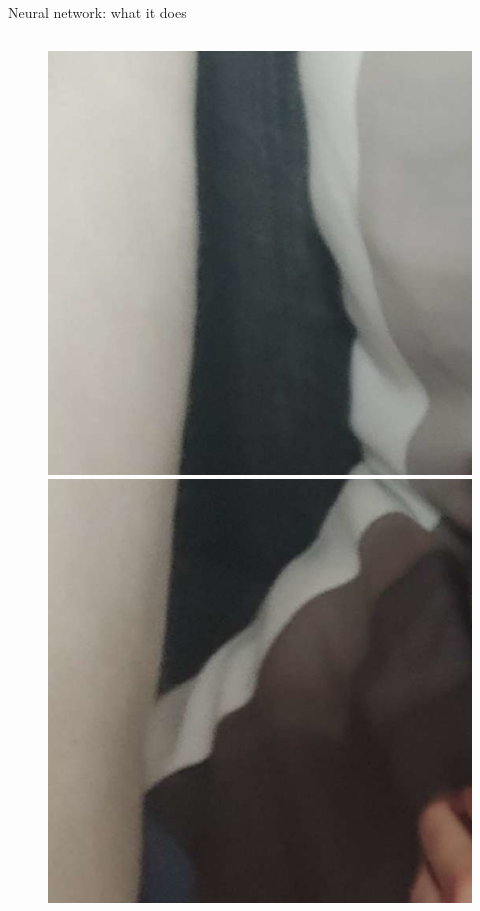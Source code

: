 \documentclass{beamer}
\begin{document}
\begin{frame}{Neural network: what it does}
\begin{columns}
\begin{column}{0.05\textwidth}
\begin{figure}
                \includegraphics[width=\linewidth]{distorted/distorted-0-1}
                \includegraphics[width=\linewidth]{distorted/distorted-0-2}

\end{figure}
\end{column}
\end{columns}
\end{frame}
\end{document}
